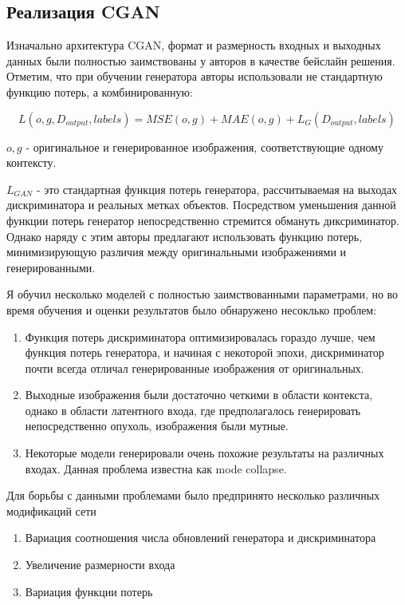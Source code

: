 \subsection{Реализация CGAN}

Изначально архитектура CGAN, формат и размерность входных и выходных данных были полностью заимствованы у авторов \cite{mirsky} в качестве бейслайн решения. Отметим, что при обучении генератора авторы использовали не стандартную функцию потерь, а комбинированную:

\begin{equation}
L(o, g, D_{output}, labels) = MSE(o, g) + MAE(o, g) + L_{G}(D_{output}, labels)
\end{equation}

$o, g$ - оригинальное и генерированное изображения, соответствующие одному контексту.

$L_{GAN}$ - это стандартная функция потерь генератора, рассчитываемая на выходах дискриминатора и реальных метках объектов. Посредством уменьшения данной функции потерь генератор непосредственно стремится обмануть диксриминатор. Однако наряду с этим авторы предлагают использовать функцию потерь, минимизирующую различия между оригинальными изображениями и генерированными.

Я обучил несколько моделей с полностью заимствованными параметрами, но во время обучения и оценки результатов было обнаружено несоклько проблем:

\begin{enumerate}
    \item Функция потерь дискриминатора оптимизировалась гораздо лучше, чем функция потерь генератора, и начиная с некоторой эпохи, дискриминатор почти всегда отличал генерированные изображения от оригинальных.
    
    \item Выходные изображения были достаточно четкими в области контекста, однако в области латентного входа, где предполагалось генерировать непосредственно опухоль, изображения были мутные.
    
    \item Некоторые модели генерировали очень похожие результаты на различных входах. Данная проблема известна как mode collapse.
\end{enumerate}

Для борьбы с данными проблемами было предпринято несколько различных модификаций сети

\begin{enumerate}
    \item Вариация соотношения числа обновлений генератора и дискриминатора
    \item Увеличение размерности входа 
    \item Вариация функции потерь
\end{enumerate}

